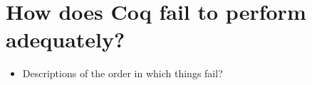 \chapter{How does Coq fail to perform adequately?} \label{ch:perf-failures}


\begin{itemize}
\item Descriptions of the order in which things fail?
\end{itemize}
